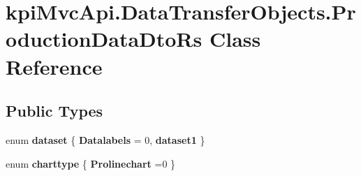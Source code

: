 \hypertarget{classkpi_mvc_api_1_1_data_transfer_objects_1_1_production_data_dto_rs}{}\section{kpi\+Mvc\+Api.\+Data\+Transfer\+Objects.\+Production\+Data\+Dto\+Rs Class Reference}
\label{classkpi_mvc_api_1_1_data_transfer_objects_1_1_production_data_dto_rs}
\subsection*{Public Types}
\begin{DoxyCompactItemize}
\item 
\mbox{\label{classkpi_mvc_api_1_1_data_transfer_objects_1_1_production_data_dto_rs_ab356c7600182705746e7b61967dd63df}} 
enum {\bfseries dataset} \{ {\bfseries Datalabels} = 0, 
{\bfseries dataset1}
 \}
\item 
\mbox{\label{classkpi_mvc_api_1_1_data_transfer_objects_1_1_production_data_dto_rs_a45716f0cdee396710530b9562be56f9a}} 
enum {\bfseries charttype} \{ {\bfseries Prolinechart} =0
 \}
\end{DoxyCompactItemize}
